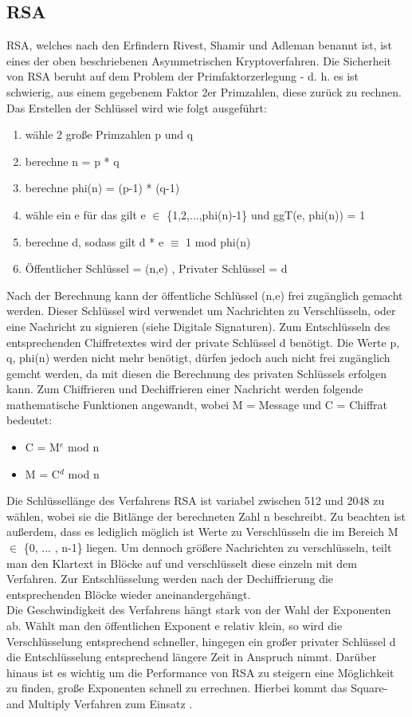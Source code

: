 \documentclass[10pt, a4paper,headsepline]{scrreprt}
\begin{document}
\subsection{RSA}
RSA, welches nach den Erfindern Rivest, Shamir und Adleman benannt ist, ist eines der oben beschriebenen Asymmetrischen Kryptoverfahren. Die Sicherheit von RSA beruht auf dem Problem der Primfaktorzerlegung - d. h. es ist schwierig, aus einem gegebenem Faktor 2er Primzahlen, diese zurück zu rechnen. \\
Das Erstellen der Schlüssel wird wie folgt ausgeführt: \\
\begin{enumerate}
\item wähle 2 große Primzahlen p und q
\item berechne n = p * q
\item berechne phi(n) = (p-1) * (q-1)
\item wähle ein e für das gilt e $\in$ \{1,2,...,phi(n)-1\} und ggT(e, phi(n)) = 1
\item berechne d, sodass gilt d * e $\equiv$ 1 mod phi(n)
\item Öffentlicher Schlüssel = (n,e) , Privater Schlüssel = d \\
\end{enumerate} 
Nach der Berechnung kann der öffentliche Schlüssel (n,e) frei zugänglich gemacht werden. Dieser Schlüssel wird verwendet um Nachrichten zu Verschlüsseln, oder eine Nachricht zu signieren (siehe Digitale Signaturen). Zum Entschlüsseln des entsprechenden Chiffretextes wird der private Schlüssel d benötigt. Die Werte p, q, phi(n) werden nicht mehr benötigt, dürfen jedoch auch nicht frei zugänglich gemcht werden, da mit diesen die Berechnung des privaten Schlüssels erfolgen kann. Zum Chiffrieren und Dechiffrieren einer Nachricht werden folgende mathematische Funktionen angewandt, wobei M = Message und C = Chiffrat bedeutet: \\
\begin{itemize}
\item C = M$^{e}$ mod n
\item M = C$^{d}$ mod n \\
\end{itemize}
Die Schlüssellänge des Verfahrens RSA ist variabel zwischen 512 und 2048 zu wählen, wobei sie die Bitlänge der berechneten Zahl n beschreibt. Zu beachten ist außerdem, dass es lediglich möglich ist Werte zu Verschlüsseln die im Bereich M $\in$ \{0, ... , n-1\} liegen. Um dennoch größere Nachrichten zu verschlüsseln, teilt man den Klartext in Blöcke auf und verschlüsselt diese einzeln mit dem Verfahren. Zur Entschlüsselung werden nach der Dechiffrierung die entsprechenden Blöcke wieder aneinandergehängt. \\
Die Geschwindigkeit des Verfahrens hängt stark von der Wahl der Exponenten ab. Wählt man den öffentlichen Exponent e relativ klein, so wird die Verschlüsselung entsprechend schneller, hingegen ein großer privater Schlüssel d die Entschlüsselung entsprechend längere Zeit in Anspruch nimmt. Darüber hinaus ist es wichtig um die Performance von RSA zu steigern eine Möglichkeit zu finden, große Exponenten schnell zu errechnen. Hierbei kommt das Square- and Multiply Verfahren zum Einsatz \citep[S. 173ff]{book:understanding-crypto}.
\end{document}
